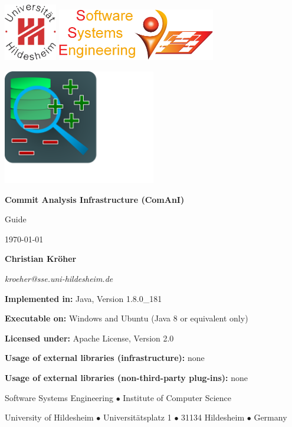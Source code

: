 \begin{titlepage}
\centering

{\includegraphics[height=2.5cm]{inserts/suh_logo.jpg} \hfill \includegraphics[height=2.3cm]{inserts/sse_logo.png}}\par\vspace{3cm}
\includegraphics[height=5cm,trim={0cm 3,4cm 9,7cm 0cm},clip]{inserts/comani_logo.pdf}\par\vspace{1cm}
{\Huge \textbf{Commit Analysis Infrastructure \newline (ComAnI)}}\par\vspace{1.5cm}
{\Huge Guide}\par\vspace{5mm}
{\Large \today}\par\vspace{1.5cm}
{\Large \textbf{Christian Kröher}}\par
{\Large \textit{kroeher@sse.uni-hildesheim.de}}\par\vspace{1.5cm}
{\textbf{Implemented in:} Java, Version 1.8.0\_181}\par
{\textbf{Executable on:} Windows and Ubuntu (Java 8 or equivalent only)}\par
{\textbf{Licensed under:} Apache License, Version 2.0}\par
{\textbf{Usage of external libraries (infrastructure):} none}\par
{\textbf{Usage of external libraries (non-third-party plug-ins):} none}\par
\vfill
{Software Systems Engineering $\bullet$ Institute of Computer Science}\par
{University of Hildesheim $\bullet$ Universit\"atsplatz 1 $\bullet$ 31134 Hildesheim $\bullet$ Germany}\par
\end{titlepage}